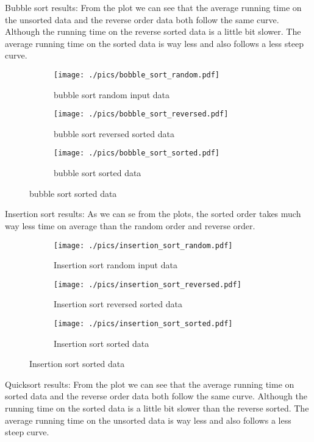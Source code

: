 
Bubble sort results:
From the plot we can see that the average running time on the unsorted data and the reverse order data both follow the same curve. Although the running time on the reverse sorted data is a little bit slower.
The average running time on the sorted data is way less and also follows a less steep curve.

\begin{figure}[H]
	\centering
	\begin{subfigure}[b]{0.5\textwidth}
		\centering
		\texttt{[image: ./pics/bobble\_sort\_random.pdf]}
		\caption{bubble sort random input data}
	\end{subfigure}
	\hfill
	\begin{subfigure}[b]{0.5\textwidth}
		\centering
		\texttt{[image: ./pics/bobble\_sort\_reversed.pdf]}
		\caption{bubble sort reversed sorted data}
	\end{subfigure}
	\hfill
	\begin{subfigure}[b]{0.5\textwidth}
		\centering
		\texttt{[image: ./pics/bobble\_sort\_sorted.pdf]}
		\caption{bubble sort sorted data}
	\end{subfigure}
\end{figure}



Insertion sort results:
As we can se from the plots, the sorted order takes much way less time on average than the random order and reverse order.

\begin{figure}[H]
	\centering
	\begin{subfigure}[b]{0.5\textwidth}
		\centering
		\texttt{[image: ./pics/insertion\_sort\_random.pdf]}
		\caption{Insertion sort random input data}
	\end{subfigure}
	\hfill
	\begin{subfigure}[b]{0.5\textwidth}
		\centering
		\texttt{[image: ./pics/insertion\_sort\_reversed.pdf]}
		\caption{Insertion sort reversed sorted data}
	\end{subfigure}
	\hfill
	\begin{subfigure}[b]{0.5\textwidth}
		\centering
		\texttt{[image: ./pics/insertion\_sort\_sorted.pdf]}
		\caption{Insertion sort sorted data}
	\end{subfigure}
\end{figure}

Quicksort results:
From the plot we can see that the average running time on sorted data and the reverse order data both follow the same curve. Although the running time on the sorted data is a little bit slower than the reverse sorted.
The average running time on the unsorted data is way less and also follows a less steep curve.


